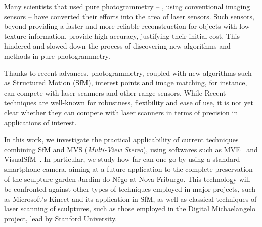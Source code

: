\documentclass[a4paper,12pt,oneside,onecolumn,final,fleqn]{repUERJ}
\theoremstyle{plain}
\theoremstyle{definition}
\begin{document}
Many scientists that used pure photogrammetry -- \ie, using conventional
imaging sensors -- have converted their efforts into the area of laser sensors.
Such sensors, beyond providing a faster and more reliable reconstruction for
objects with low texture information, provide high accuracy, justifying their
initial cost.  This hindered and slowed down the process of discovering new algorithms
and methods in pure photogrammetry.

Thanks to recent advances, photogrammetry, coupled with new algorithms
such as Structured Motion (SfM), interest points and image matching, for instance,
can compete with laser scanners and other range sensors. While Recent techniques are well-known for robustness, flexibility and ease of use, it is not yet clear whether they can compete with laser scanners in terms of precision in applications of interest.

In this work, we investigate the practical applicability of current techniques
combining SfM and MVS (\emph{Multi-View Stereo}), using softwares such as
MVE~\cite{mve} and VisualSfM~\cite{wu2011visualsfm}. In particular, we study
how far can one go by using a standard smartphone camera, aiming at a future application to the complete preservation of the sculpture garden Jardim do Nêgo at Nova Friburgo. 
This technology will be confronted against other types of techniques employed in
major projects, such as Microsoft's Kinect and its application in SfM, as well as
classical techniques of laser scanning of sculptures, such as those employed in
the Digital Michaelangelo project, lead by Stanford University.



\printkeys


\listadefiguras

\end{document}
